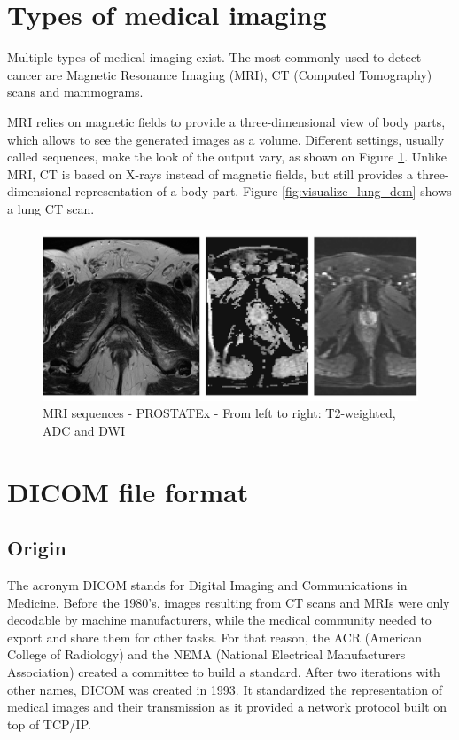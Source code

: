 \section{Types of medical imaging}
\label{sec:medical_imaging}
\setlength{\marginparwidth}{3cm}\leavevmode {}Multiple types of medical imaging exist. The most commonly used to detect cancer are Magnetic Resonance Imaging (MRI), CT (Computed Tomography) scans and mammograms.

MRI relies on magnetic fields to provide a three-dimensional view of body parts, which allows to see the generated images as a volume. Different settings, usually called sequences, make the look of the output vary, as shown on Figure \ref{fig:PROSTATEx-t2-adc-dwi}.
Unlike MRI, CT is based on X-rays instead of magnetic fields, but still provides a three-dimensional representation of a body part. Figure \ref{fig:visualize_lung_dcm} shows a lung CT scan.

\begin{figure}[!h]
\centering
\includegraphics[width=1\textwidth, keepaspectratio=true]{./figures/PROSTATEx-t2-adc-dwi.png}
\caption{MRI sequences - PROSTATEx - From left to right: T2-weighted, ADC and DWI}
\label{fig:PROSTATEx-t2-adc-dwi}
\end{figure}


\section{DICOM file format}
\label{sec:DICOM}
\subsection{Origin}
\setlength{\marginparwidth}{3cm}\leavevmode {}The acronym DICOM stands for Digital Imaging and Communications in Medicine. Before the 1980’s, images resulting from CT scans and MRIs were only decodable by machine manufacturers, while the medical community needed to export and share them for other tasks. For that reason, the ACR (American College of Radiology) and the NEMA (National Electrical Manufacturers Association) created a committee to build a standard. After two iterations with other names, DICOM was created in 1993. It standardized the representation of medical images and their transmission as it provided a network protocol built on top of TCP/IP.



